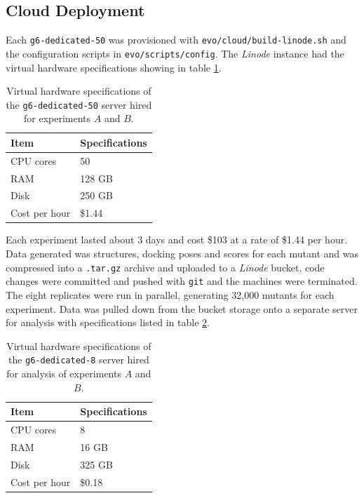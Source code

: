 \documentclass[16pt]{book}
\begin{document}
\subsection{Cloud Deployment \label{cloud}}
Each \texttt{g6-dedicated-50} was provisioned with \texttt{evo/cloud/build-linode.sh} and the configuration scripts in \texttt{evo/scripts/config}.
The \textit{Linode} instance had the virtual hardware specifications showing in table \ref{linode}.

\begin{table}
        \begin{center}
		\caption{\label{linode} Virtual hardware specifications of the \texttt{g6-dedicated-50} server hired for experiments $A$ and $B$.}
                \begin{tabular}{l|p{3cm}}
		\textbf{Item} & \textbf{Specifications} \\
                \hline
			CPU cores & 50 \\
			RAM & 128 GB \\
			Disk & 250 GB \\
			Cost per hour & \$1.44 \\
        \end{tabular}
        \end{center}
\end{table}

Each experiment lasted about 3 days and cost \$103 at a rate of \$1.44 per hour. 
Data generated was structures, docking poses and scores for each mutant and was compressed into a \texttt{.tar.gz} archive and uploaded to a \textit{Linode} bucket, code changes were committed and pushed with \texttt{git}  and the machines were terminated.
The eight replicates were run in parallel, generating 32,000 mutants for each experiment.
Data was pulled down from the bucket storage onto a separate server for analysis with specifications listed in table \ref{analysis}.

\begin{table}
        \begin{center}
		\caption{\label{analysis} Virtual hardware specifications of the \texttt{g6-dedicated-8} server hired for analysis of experiments $A$ and $B$.}
                \begin{tabular}{l|p{3cm}}
		\textbf{Item} & \textbf{Specifications} \\
                \hline
			CPU cores & 8 \\
			RAM & 16 GB \\
			Disk & 325 GB \\
			Cost per hour & \$0.18 \\
        \end{tabular}
        \end{center}
\end{table}
\end{document}
